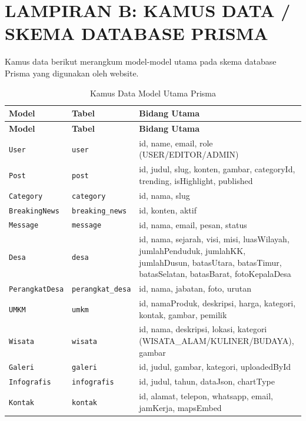 \documentclass[12pt,a4paper]{report}
\begin{document}
\chapter{LAMPIRAN B: KAMUS DATA / SKEMA DATABASE PRISMA}

Kamus data berikut merangkum model-model utama pada skema database Prisma yang digunakan oleh website.

\begin{longtable}{p{} p{} p{}}
    \caption{Kamus Data Model Utama Prisma}\\
    \toprule
    \textbf{Model} & \textbf{Tabel} & \textbf{Bidang Utama} \\
    \midrule
    \endfirsthead
    \toprule
    \textbf{Model} & \textbf{Tabel} & \textbf{Bidang Utama} \\
    \midrule
    \endhead
    \bottomrule
    \endfoot
    \texttt{User} & \texttt{user} & id, name, email, role (USER/EDITOR/ADMIN) \\
    \texttt{Post} & \texttt{post} & id, judul, slug, konten, gambar, categoryId, trending, isHighlight, published \\
    \texttt{Category} & \texttt{category} & id, nama, slug \\
    \texttt{BreakingNews} & \texttt{breaking\_news} & id, konten, aktif \\
    \texttt{Message} & \texttt{message} & id, nama, email, pesan, status \\
    \texttt{Desa} & \texttt{desa} & id, nama, sejarah, visi, misi, luasWilayah, jumlahPenduduk, jumlahKK, jumlahDusun, batasUtara, batasTimur, batasSelatan, batasBarat, fotoKepalaDesa \\
    \texttt{PerangkatDesa} & \texttt{perangkat\_desa} & id, nama, jabatan, foto, urutan \\
    \texttt{UMKM} & \texttt{umkm} & id, namaProduk, deskripsi, harga, kategori, kontak, gambar, pemilik \\
    \texttt{Wisata} & \texttt{wisata} & id, nama, deskripsi, lokasi, kategori (WISATA\_ALAM/KULINER/BUDAYA), gambar \\
    \texttt{Galeri} & \texttt{galeri} & id, judul, gambar, kategori, uploadedById \\
    \texttt{Infografis} & \texttt{infografis} & id, judul, tahun, dataJson, chartType \\
    \texttt{Kontak} & \texttt{kontak} & id, alamat, telepon, whatsapp, email, jamKerja, mapsEmbed \\
    \end{longtable}
\end{document}
